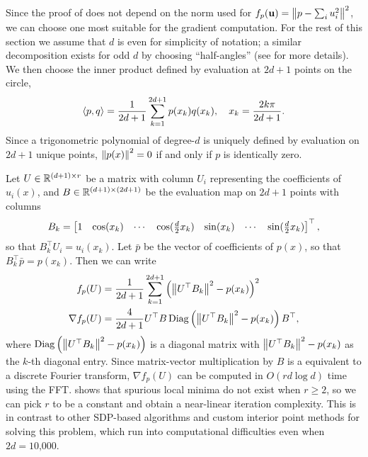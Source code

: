 \documentclass[final,onefignum,onetabnum]{siamart220329}
\begin{document}
Since the proof of  does not depend on the norm used for
$f_p(\boldsymbol{\mathbf{u}}) = \left\lVert p - \sum_i u_i^2 \right\lVert^2$, we can choose one most suitable for
the gradient computation. For the rest of this section we assume that $d$ is
even for simplicity of notation; a similar decomposition exists for odd $d$ by
choosing ``half-angles'' (see \cite{Lofbergcoefficientssamplesnew2004} for more
details). We then choose the inner product defined by evaluation at $2d+1$
points on the circle,
\begin{align*}
  \left\langle p, q \right\rangle = \frac{1}{2d+1} \sum_{k=1}^{2d+1} p(x_k) q(x_k), \quad x_k = \frac{2k\pi}{2d+1}.
\end{align*}
Since a trigonometric polynomial of degree-$d$ is uniquely defined by evaluation
on $2d+1$ unique points, $\left\lVert p(x) \right\lVert^2 = 0$ if and only if $p$ is identically
zero.

Let $U \in \mathbb{R}^{(d+1) \times r}$ be a matrix with column $U_i$ representing the
coefficients of $u_i(x)$, and $B \in \mathbb{R}^{(d+1) \times (2d+1)}$ be the evaluation
map on $2d+1$ points with columns
\begin{align*}
  B_k = \begin{bmatrix}1 & \cos(x_k) & \cdots & \cos(\frac{d}{2} x_k) &
              \sin(x_k) & \cdots & \sin(\frac{d}{2} x_k)\end{bmatrix}^\top,
\end{align*}
so that $B_k^\top U_i = u_i(x_k)$. Let $\bar{p}$ be the vector of coefficients of
$p(x)$, so that $B_k^\top \bar{p} = p(x_k)$. Then we can write
\begin{align*}
  f_p(U) &= \frac{1}{2d+1} \sum_{k=1}^{2d+1} \left( \left\lVert U^\top B_k \right\lVert^2 - p(x_k) \right)^2 \\
  \nabla f_p(U) &= \frac{4}{2d+1} U^\top B \operatorname{Diag}\left( \left\lVert U^\top B_k \right\lVert^2 - p(x_k) \right) B^\top,
\end{align*}
where $\operatorname{Diag}\left( \left\lVert U^\top B_k \right\lVert^2 - p(x_k) \right)$ is a diagonal matrix with
$\left\lVert U^\top B_k \right\lVert^2 - p(x_k)$ as the $k$-th diagonal entry. Since matrix-vector
multiplication by $B$ is a equivalent to a discrete Fourier transform,
$\nabla f_p(U)$ can be computed in $O(r d \log d)$ time using the
FFT.  shows that spurious local minima do not exist when
$r \ge 2$, so we can pick $r$ to be a constant and obtain a near-linear
iteration complexity. This is in contrast to other SDP-based algorithms and
custom interior point methods for solving this problem, which run into
computational difficulties even when $2d = \text{10,000}$.
\end{document}
